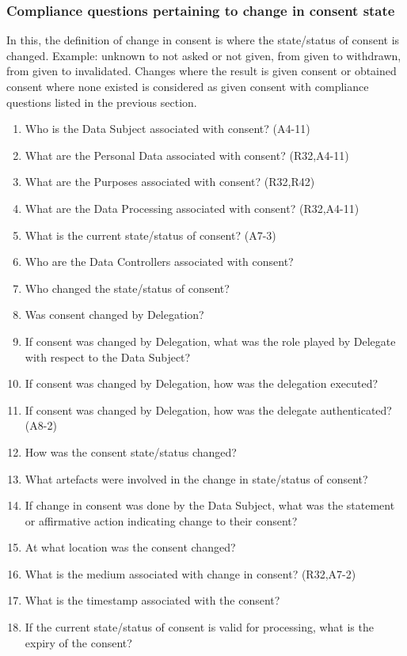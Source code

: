 \subsubsection{Compliance questions pertaining to change in consent state}
In this, the definition of change in consent is where the state/status of consent is changed. Example: unknown to not asked or not given, from given to withdrawn, from given to invalidated. Changes where the result is given consent or obtained consent where none existed is considered as given consent with compliance questions listed in the previous section.
\begin{enumerate}[label={\textit{CMQ.\theenumi}},resume]
    \item Who is the Data Subject associated with consent? (A4-11)
    \item What are the Personal Data associated with consent? (R32,A4-11)
    \item What are the Purposes associated with consent? (R32,R42)
    \item What are the Data Processing associated with consent? (R32,A4-11)
    \item What is the current state/status of consent? (A7-3)
    \item Who are the Data Controllers associated with consent?
    \item Who changed the state/status of consent?
    \item Was consent changed by Delegation?
    \item If consent was changed by Delegation, what was the role played by Delegate with respect to the Data Subject?
    \item If consent was changed by Delegation, how was the delegation executed?
    \item If consent was changed by Delegation, how was the delegate authenticated? (A8-2)
    \item How was the consent state/status changed?
    \item What artefacts were involved in the change in state/status of consent?
    \item If change in consent was done by the Data Subject, what was the statement or affirmative action indicating change to their consent?
    \item At what location was the consent changed?
    \item What is the medium associated with change in consent? (R32,A7-2)
    \item What is the timestamp associated with the consent?
    \item If the current state/status of consent is valid for processing, what is the expiry of the consent?
\end{enumerate}

